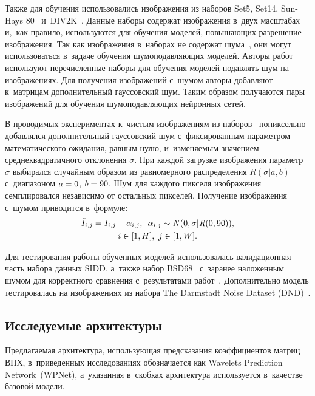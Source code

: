 \begin{multicols}{2}
Также для обучения использовались изображения из наборов Set5, Set14, Sun-Hays 
80~\cite{FOR_ADD_NOISE_DATASETS} и~DIV2K~\cite{DIV2KDataset}. Данные наборы 
содержат изображения в~двух масштабах и,~как правило, используются для обуче\-ния 
моделей, повышающих разрешение изображения. Так как изображения в~наборах не 
содержат шума~\cite{FOR_ADD_NOISE_DATASETS}, они могут использоваться в~задаче 
обучения шумоподавляющих моделей. Авторы работ~\cite{MWCNN, MDIWT} 
используют перечисленные наборы для обучения моделей подавлять шум на 
изображениях. Для получения изображений с~шумом авторы до\-бав\-ля\-ют к~мат\-ри\-цам 
дополнительный гауссовский шум. Таким образом получаются пары изображений для 
обучения шумоподавляющих нейронных сетей.

В проводимых экспериментах к~чистым изоб\-ра\-же\-ни\-ям из 
наборов~\cite{FOR_ADD_NOISE_DATASETS, DIV2KDataset} попиксельно до\-бав\-лял\-ся 
дополнительный гауссовский шум с~фиксированным параметром математического 
ожидания, равным нулю, и~изменяемым значением среднеквадратичного отклонения 
$\sigma$. При каждой загрузке изображения параметр~$\sigma$ выбирался случайным 
образом из равномерного распределения $R(\sigma|a, b)$ с~диапазоном $a \hm= 0$, $b \hm= 
90$. Шум для каждого пикселя изображения семплировался независимо от остальных 
пикселей. Получение изображения с~шумом приводится в~формуле:
\begin{multline*}
\tilde{I}_{i,j} = I_{i,j} + \alpha_{i,j},\enskip \alpha_{i,j} \sim \mathit{N}(0, \sigma|\mathit{R}(0, 90)),\\ 
i \in [1, H],\ j \in [1, W].
\end{multline*}

Для тестирования работы обученных моделей использовалась валидационная часть 
набора данных SIDD, а~также набор BSD68~\cite{BSD_set} с~заранее наложенным 
шумом для корректного сравнения с~результатами работ~\cite{MWCNN, MDIWT, WINNet}. Дополнительно модель тестировалась на изображениях из набора The 
Darmstadt Noise Dataset (DND)~\cite{DNDSet}.


\subsection{Исследуемые архитектуры}

Предлагаемая архитектура, использующая предсказания коэффициентов матриц ВПХ, 
в~приведенных исследованиях обозначается как Wavelets Prediction Network~(WPNet), 
а~указанная в~скобках архитектура используется в~качестве базовой мо\-дели.


\end{multicols}
